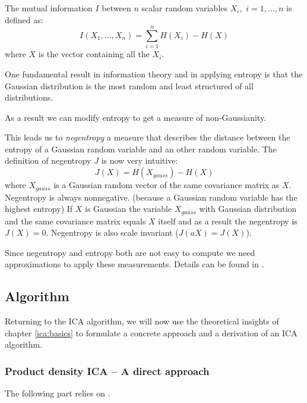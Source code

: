 \documentclass[12pt, a4paper]{article}
\numberwithin{equation}{section}
\numberwithin{figure}{section}
\numberwithin{table}{section}
\begin{document}
	The mutual information \mbox{$I$} between \mbox{$n$} scalar random variables \mbox{$X_i$, $ i=1,\dots,n$} is defined as:
	\begin{equation}
	I(X_1,\dots,X_n)=\sum_{i=1}^{n}H(X_i)-H(X)
	\end{equation}
	where $X$ is the vector containing all the \mbox{$X_i$}.
	
	One fundamental result in information theory and in applying entropy is that the Gaussian distribution is the most random and least structured of all distributions.
	
	As a result we can modify entropy to get a measure of non-Gaussianity.
	
	This leads us to \textit{negentropy} a measure that describes the distance between the entropy of a Gaussian random variable and an other random variable.
	The definition of negentropy $J$ is now very intuitive:
	\begin{equation}
	J(X) = H(X_{gauss})-H(X)
	\end{equation}
	where \mbox{$X_{gauss}$} is a Gaussian random vector of the same covariance matrix as $X$. %
	Negentropy is always nonnegative. (because a Gaussian random variable has the highest entropy)
	If $X$ is Gaussian the variable \mbox{$X_{gauss}$} with Gaussian
	distribution and the same covariance matrix equals $X$ itself
	and as a result the negentropy is \mbox{$J(X)=0$}.
	Negentropy is also scale invariant \mbox{($J(aX)=J(X)$)}.%
	
	Since negentropy and entropy both are not easy to compute
	we need approximations to apply these measurements.
	Details can be found in \citet{ICA_Book}.
	
	\subsection{Algorithm} \label{ica:algorithm}
	Returning to the ICA algorithm, we will now use the theoretical insights of chapter \ref{ica:basics} to formulate a concrete approach and a derivation of an ICA algorithm.
	
	\subsubsection{Product density ICA --  A direct approach}\label{ica:approach}
	The following part %
	relies on \citet{elementsofstatisticallearning}.
	
\end{document}

